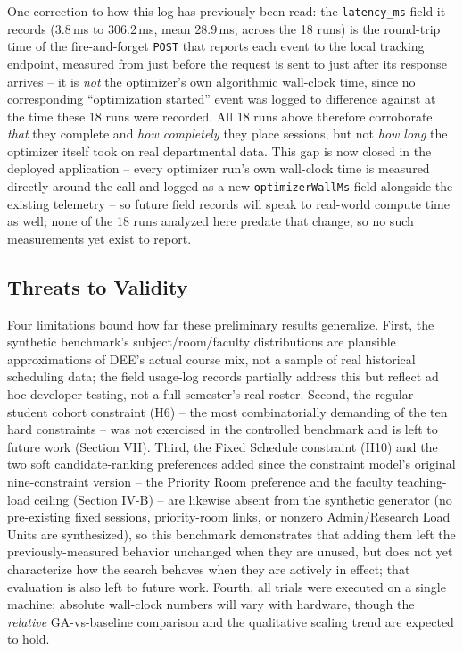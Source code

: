 \documentclass[conference]{IEEEtran}
\begin{document}
One correction to how this log has previously been read: the \texttt{latency\_ms} field it records (3.8\,ms to 306.2\,ms, mean 28.9\,ms, across the 18 runs) is the round-trip time of the fire-and-forget \texttt{POST} that reports each event to the local tracking endpoint, measured from just before the request is sent to just after its response arrives -- it is \emph{not} the optimizer's own algorithmic wall-clock time, since no corresponding ``optimization started'' event was logged to difference against at the time these 18 runs were recorded. All 18 runs above therefore corroborate \emph{that} they complete and \emph{how completely} they place sessions, but not \emph{how long} the optimizer itself took on real departmental data. This gap is now closed in the deployed application -- every optimizer run's own wall-clock time is measured directly around the call and logged as a new \texttt{optimizerWallMs} field alongside the existing telemetry -- so future field records will speak to real-world compute time as well; none of the 18 runs analyzed here predate that change, so no such measurements yet exist to report.

\subsection{Threats to Validity}
Four limitations bound how far these preliminary results generalize. First, the synthetic benchmark's subject/room/faculty distributions are plausible approximations of DEE's actual course mix, not a sample of real historical scheduling data; the field usage-log records partially address this but reflect ad hoc developer testing, not a full semester's real roster. Second, the regular-student cohort constraint (H6) -- the most combinatorially demanding of the ten hard constraints -- was not exercised in the controlled benchmark and is left to future work (Section VII). Third, the Fixed Schedule constraint (H10) and the two soft candidate-ranking preferences added since the constraint model's original nine-constraint version -- the Priority Room preference and the faculty teaching-load ceiling (Section IV-B) -- are likewise absent from the synthetic generator (no pre-existing fixed sessions, priority-room links, or nonzero Admin/Research Load Units are synthesized), so this benchmark demonstrates that adding them left the previously-measured behavior unchanged when they are unused, but does not yet characterize how the search behaves when they are actively in effect; that evaluation is also left to future work. Fourth, all trials were executed on a single machine; absolute wall-clock numbers will vary with hardware, though the \emph{relative} GA-vs-baseline comparison and the qualitative scaling trend are expected to hold.
\end{document}
